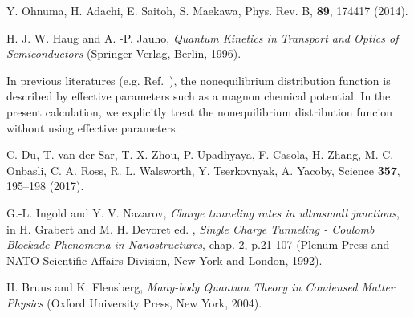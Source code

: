 \documentclass[aps,prl,reprint,showpacs]{revtex4-1}
\begin{document}
\begin{thebibliography}{10}
Y. Ohnuma, H. Adachi, E. Saitoh, S. Maekawa, Phys. Rev. B, {\bf 89}, 174417 (2014). 

H. J. W. Haug and A. -P. Jauho, {\it Quantum Kinetics in Transport and Optics of Semiconductors} (Springer-Verlag, Berlin, 1996). 

In previous literatures (e.g. Ref.~), the nonequilibrium distribution function is described by effective parameters such as a magnon chemical potential.
In the present calculation, we explicitly treat the nonequilibrium distribution funcion without using effective parameters.

 C. Du, T. van der Sar, T. X. Zhou, P. Upadhyaya, F. Casola, H. Zhang, M. C. Onbasli, C. A. Ross, R. L. Walsworth, Y. Tserkovnyak, A. Yacoby, 
Science {\bf 357}, 195–198 (2017).

G.-L. Ingold and Y. V. Nazarov, {\it Charge tunneling rates in ultrasmall junctions},
in H. Grabert and M. H. Devoret ed. , {\it Single Charge Tunneling - Coulomb Blockade Phenomena in Nanostructures}, chap. 2, p.21-107 (Plenum Press and NATO Scientific Affairs Division, New York and London, 1992).

H. Bruus and K. Flensberg, {\it Many-body Quantum Theory in Condensed Matter Physics} (Oxford University Press, New York, 2004).


\end{thebibliography}
\end{document}
